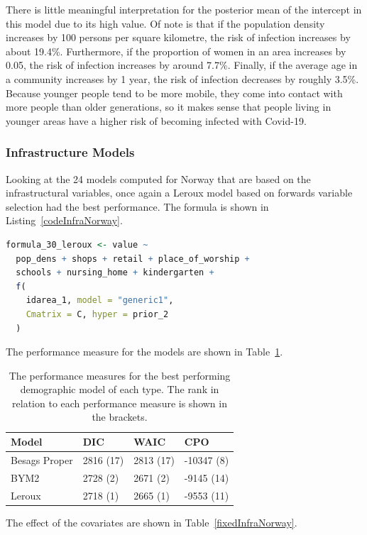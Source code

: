 There is little meaningful interpretation for the posterior mean of the intercept in this model due to its high value. Of note is that if the population density increases by 100 persons per square kilometre, the risk of infection increases by about 19.4\%. Furthermore, if the proportion of women in an area increases by 0.05, the risk of infection increases by around 7.7\%. Finally, if the average age in a community increases by 1 year, the risk of infection decreases by roughly 3.5\%. Because younger people tend to be more mobile, they come into contact with more people than older generations, so it makes sense that people living in younger areas have a higher risk of becoming infected with Covid-19.
\subsubsection{Infrastructure Models}
Looking at the 24 models computed for Norway that are based on the infrastructural variables, once again a Leroux model based on forwards variable selection had the best performance. The formula is shown in Listing~\ref{codeInfraNorway}.
\begin{lstlisting}[caption={The formula for the best Leroux model based on the infrastructural variables}, label={codeInfraNorway}, language = R]
formula_30_leroux <- value ~
  pop_dens + shops + retail + place_of_worship +
  schools + nursing_home + kindergarten +
  f(
    idarea_1, model = "generic1",
    Cmatrix = C, hyper = prior_2
  )
\end{lstlisting}
The performance measure for the models are shown in Table~\ref{infraNorway}.
\begin{table}[H] 
\caption{The performance measures for the best performing demographic model of each type. The rank in relation to each performance measure is shown in the brackets. \label{infraNorway}}
\begin{tabular}{l l l l}
\toprule
\textbf{Model}	& \textbf{DIC}	& \textbf{WAIC} & \textbf{CPO} \\
\midrule
Besags Proper  & 2816 (17) & 2813 (17) & -10347 (8) \\
BYM2 & 2728 (2) & 2671 (2) & -9145 (14)\\
Leroux & 2718 (1) & 2665 (1) & -9553 (11) \\
\bottomrule
\end{tabular}
\end{table}
The effect of the covariates are shown in Table~\ref{fixedInfraNorway}.
